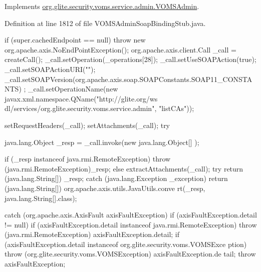 Implements \hyperlink{interfaceorg_1_1glite_1_1security_1_1voms_1_1service_1_1admin_1_1VOMSAdmin_aca6b571c31d7a6b4f1bba9eac8b50f33}{org.glite.security.voms.service.admin.VOMSAdmin}.



Definition at line 1812 of file VOMSAdminSoapBindingStub.java.


\begin{DoxyCode}
                                                                                 
                                    {
        if (super.cachedEndpoint == null) {
            throw new org.apache.axis.NoEndPointException();
        }
        org.apache.axis.client.Call _call = createCall();
        _call.setOperation(_operations[28]);
        _call.setUseSOAPAction(true);
        _call.setSOAPActionURI("");
        _call.setSOAPVersion(org.apache.axis.soap.SOAPConstants.SOAP11_CONSTANTS)
      ;
        _call.setOperationName(new javax.xml.namespace.QName("http://glite.org/ws
      dl/services/org.glite.security.voms.service.admin", "listCAs"));

        setRequestHeaders(_call);
        setAttachments(_call);
 try {        java.lang.Object _resp = _call.invoke(new java.lang.Object[] {});

        if (_resp instanceof java.rmi.RemoteException) {
            throw (java.rmi.RemoteException)_resp;
        }
        else {
            extractAttachments(_call);
            try {
                return (java.lang.String[]) _resp;
            } catch (java.lang.Exception _exception) {
                return (java.lang.String[]) org.apache.axis.utils.JavaUtils.conve
      rt(_resp, java.lang.String[].class);
            }
        }
  } catch (org.apache.axis.AxisFault axisFaultException) {
    if (axisFaultException.detail != null) {
        if (axisFaultException.detail instanceof java.rmi.RemoteException) {
              throw (java.rmi.RemoteException) axisFaultException.detail;
         }
        if (axisFaultException.detail instanceof org.glite.security.voms.VOMSExce
      ption) {
              throw (org.glite.security.voms.VOMSException) axisFaultException.de
      tail;
         }
   }
  throw axisFaultException;
}
    }
\end{DoxyCode}

